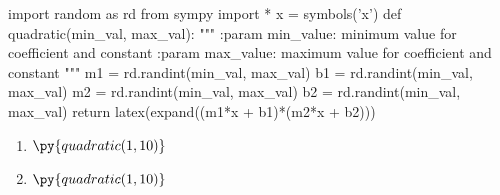 \documentclass{article}
\begin{document}
\begin{pycode}
import random as rd
from sympy import *
x = symbols('x')
def quadratic(min_val, max_val):
    """
    :param min_value: minimum value for coefficient and constant
    :param max_value: maximum value for coefficient and constant
    """
    m1 = rd.randint(min_val, max_val)
    b1 = rd.randint(min_val, max_val)
    m2 = rd.randint(min_val, max_val)
    b2 = rd.randint(min_val, max_val)
    return latex(expand((m1*x + b1)*(m2*x + b2)))
\end{pycode}

\begin{enumerate}
\item $\py{quadratic(1,10)}$
\item $\py{quadratic(1,10)}$
\end{enumerate}
\end{document}

